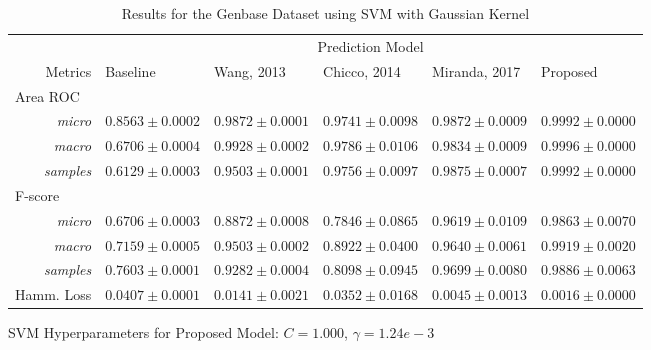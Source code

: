 \begin{table}[h!]
    \footnotesize
    \centering
    \caption{Results for the Genbase Dataset using SVM with Gaussian Kernel}
    \label{results:genbase_svm}
    \begin{threeparttable}
    \begin{tabular}{@{}rrlllll@{}}
    \toprule
    && \multicolumn{5}{c}{Prediction Model} \\ \cmidrule{3-7}
    \multicolumn{2}{r}{Metrics}               & Baseline                & Wang, 2013 & Chicco, 2014 & Miranda, 2017 & Proposed            \\ \midrule
\multicolumn{2}{l}{Area ROC} \\
           & \textit{micro}       & $0.8563 \pm 0.0002$ & $0.9872 \pm 0.0001$ &
$0.9741 \pm 0.0098$ & $0.9872 \pm 0.0009$ & $\mathbf{0.9992 \pm 0.0000}$ \\
            & \textit{macro}       & $0.6706 \pm 0.0004$ & $0.9928 \pm 0.0002$
            & $0.9786 \pm 0.0106$ & $0.9834 \pm 0.0009$ & $\mathbf{0.9996 \pm
            0.0000}$ \\
            & \textit{samples}       & $0.6129 \pm 0.0003$ & $0.9503 \pm
0.0001$ & $0.9756 \pm 0.0097$ & $0.9875 \pm 0.0007$ & $\mathbf{0.9992 \pm
0.0000}$ \\
\multicolumn{2}{l}{F-score} \\
           & \textit{micro}       & $0.6706 \pm 0.0003$ & $0.8872 \pm 0.0008$ &
$0.7846 \pm 0.0865$ & $0.9619 \pm 0.0109$ & $\mathbf{0.9863 \pm 0.0070}$ \\
            & \textit{macro}       & $0.7159 \pm 0.0005$ & $0.9503 \pm 0.0002$
            & $0.8922 \pm 0.0400$ & $0.9640 \pm 0.0061$ & $\mathbf{0.9919 \pm
            0.0020}$ \\
            & \textit{samples}       & $0.7603 \pm 0.0001$ & $0.9282 \pm 0.0004$ & $0.8098 \pm 0.0945$ & $0.9699 \pm 0.0080$ & $\mathbf{0.9886 \pm 0.0063}$ \\ 
    \multicolumn{2}{l}{Hamm. Loss} & $0.0407 \pm 0.0001$ & $0.0141 \pm 0.0021$
                                   & $0.0352 \pm 0.0168$ & $0.0045 \pm 0.0013$
                                   & $\mathbf{0.0016 \pm 0.0000}$ \\ \bottomrule
    \end{tabular}
    \begin{tablenotes}
        \item SVM Hyperparameters for Proposed Model: $C=1.000$, $\gamma=1.24e-3$
    \end{tablenotes}
    \end{threeparttable}
    \end{table}
